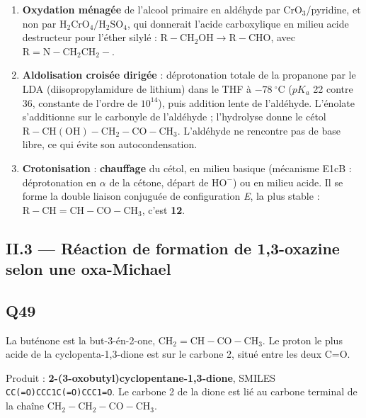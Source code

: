 \documentclass[11pt,a4paper]{article}
\providecommand{\tightlist}{\setlength{\itemsep}{0pt}\setlength{\parskip}{0pt}}
\begin{document}
\begin{enumerate}
\def\labelenumi{\arabic{enumi}.}
\tightlist
\item
  \textbf{Oxydation ménagée} de l'alcool primaire en aldéhyde par \(\mathrm{CrO_3}\)/pyridine, et non par \(\mathrm{H_2CrO_4}/\mathrm{H_2SO_4}\), qui donnerait l'acide carboxylique en milieu acide destructeur pour l'éther silylé : \(\mathrm{R{-}CH_2OH}\to\mathrm{R{-}CHO}\), avec \(\mathrm R=\mathrm{N{-}CH_2CH_2{-}}\).
\item
  \textbf{Aldolisation croisée dirigée} : déprotonation totale de la propanone par le LDA (diisopropylamidure de lithium) dans le THF à \(-78\ ^\circ\)C (\(pK_a\) 22 contre 36, constante de l'ordre de \(10^{14}\)), puis addition lente de l'aldéhyde. L'énolate s'additionne sur le carbonyle de l'aldéhyde ; l'hydrolyse donne le cétol \(\mathrm{R{-}CH(OH){-}CH_2{-}CO{-}CH_3}\). L'aldéhyde ne rencontre pas de base libre, ce qui évite son autocondensation.
\item
  \textbf{Crotonisation} : \textbf{chauffage} du cétol, en milieu basique (mécanisme E1cB : déprotonation en \(\alpha\) de la cétone, départ de \(\mathrm{HO^-}\)) ou en milieu acide. Il se forme la double liaison conjuguée de configuration \emph{E}, la plus stable : \(\mathrm{R{-}CH{=}CH{-}CO{-}CH_3}\), c'est \textbf{12}.
\end{enumerate}

\hypertarget{ii.3-ruxe9action-de-formation-de-13-oxazine-selon-une-oxa-michael}{%
\subsection{II.3 --- Réaction de formation de 1,3-oxazine selon une oxa-Michael}\label{ii.3-ruxe9action-de-formation-de-13-oxazine-selon-une-oxa-michael}}

\hypertarget{q49}{%
\subsection{Q49}\label{q49}}

La buténone est la but-3-én-2-one, \(\mathrm{CH_2{=}CH{-}CO{-}CH_3}\). Le proton le plus acide de la cyclopenta-1,3-dione est sur le carbone 2, situé entre les deux C=O.

Produit : \textbf{2-\allowbreak{}(3-\allowbreak{}oxobutyl)cyclopentane-\allowbreak{}1,3-\allowbreak{}dione}, SMILES \texttt{CC(\allowbreak{}=\allowbreak{}O)\allowbreak{}CCC1C(\allowbreak{}=\allowbreak{}O)\allowbreak{}CCC1=\allowbreak{}O}. Le carbone 2 de la dione est lié au carbone terminal de la chaîne \(\mathrm{CH_2{-}CH_2{-}CO{-}CH_3}\).
\end{document}
